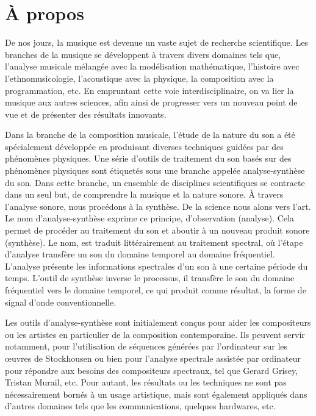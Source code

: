 
\section{À propos}

De nos jours, la musique est devenue un vaste sujet de recherche scientifique. Les branches de la musique se développent à travers divers domaines tels que, l'analyse musicale mélangée avec la modélisation mathématique, l’histoire avec l’ethnomusicologie, l’acoustique avec la physique, la composition avec la programmation, etc. En empruntant cette voie interdisciplinaire, on va lier la musique aux autres sciences, afin ainsi de progresser vers un nouveau point de vue et de présenter des résultats innovants.

Dans la branche de la composition musicale, l’étude de la nature du son a été spécialement développée en produisant diverses techniques guidées par des phénomènes physiques. Une série d'outils de traitement du son basés sur des phénomènes physiques sont étiquetés sous une branche appelée analyse-synthèse du son. Dans cette branche, un ensemble de disciplines scientifiques se contracte dans un seul but, de comprendre la musique et la nature sonore. À travers l’analyse sonore, nous procédons à la synthèse. De la science nous alons vers l'art. Le nom d'analyse-synthèse exprime ce principe, d’observation (analyse). Cela permet de procéder au traitement du son et aboutir à un nouveau produit sonore (synthèse). Le nom, est traduit littérairement au traitement spectral, où l’étape d’analyse transfère un son du domaine temporel au domaine fréquentiel. L'analyse présente les informations spectrales d'un son à une certaine période du temps. L'outil de synthèse inverse le processus, il transfère le son du domaine fréquentiel vers le domaine temporel, ce qui produit comme résultat, la forme de signal d'onde conventionnelle.

Les outils d'analyse-synthèse sont initialement conçus pour aider les compositeurs ou les artistes en particulier de la composition contemporaine. Ils peuvent servir notamment, pour l'utilisation de séquences générées par l’ordinateur sur les œuvres de Stockhousen ou bien pour l’analyse spectrale assistée par ordinateur pour répondre aux besoins des compositeurs spectraux, tel que Gerard Grisey, Tristan Murail, etc. Pour autant, les résultats ou les techniques ne sont pas nécessairement bornés à un usage artistique, mais sont également appliqués dans d'autres domaines tels que les communications, quelques hardwares, etc.

